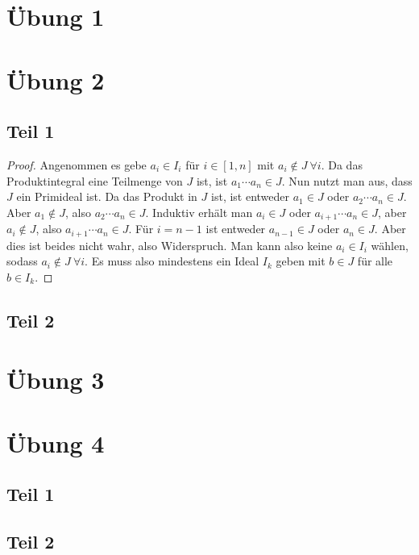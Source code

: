 \documentclass[10pt,a4paper]{article}
\begin{document}
\section{Übung 1}

\section{Übung 2}

\subsection{Teil 1}

\begin{proof}
  Angenommen es gebe $a_{i} \in I_{i}$ für $i \in [1, n]$ mit $a_{i} \not\in J\ \forall i$.
  Da das Produktintegral eine Teilmenge von $J$ ist, ist $a_{1} \cdots a_{n} \in J$.
  Nun nutzt man aus, dass $J$ ein Primideal ist.
  Da das Produkt in $J$ ist, ist entweder $a_{1} \in J$ oder $a_{2} \cdots a_{n} \in J$.
  Aber $a_{1} \not\in J$, also $a_{2} \cdots a_{n} \in J$.
  Induktiv erhält man $a_{i} \in J$ oder $a_{i + 1} \cdots a_{n} \in J$, aber $a_{i} \not\in J$, also $a_{i + 1} \cdots a_{n} \in J$.
  Für $i = n - 1$ ist entweder $a_{n - 1} \in J$ oder $a_{n} \in J$.
  Aber dies ist beides nicht wahr, also Widerspruch.
  Man kann also keine $a_{i} \in I_{i}$ wählen, sodass $a_{i} \not\in J\ \forall i$.
  Es muss also mindestens ein Ideal $I_{k}$ geben mit $b \in J$ für alle $b \in I_{k}$.
\end{proof}

\subsection{Teil 2}

\section{Übung 3}

\section{Übung 4}

\subsection{Teil 1}

\subsection{Teil 2}
\end{document}
